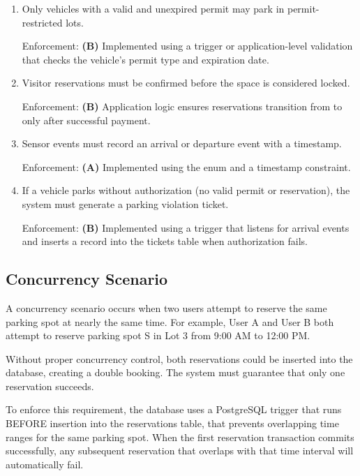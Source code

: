 \documentclass[12pt]{report}
\begin{document}
\begin{enumerate}[label=\textbf{Rule \arabic*:}]
\item Only vehicles with a valid and unexpired permit may park in permit-restricted lots.

Enforcement: \textbf{(B)} Implemented using a trigger or application-level validation that checks the vehicle's permit type and expiration date.

\item Visitor reservations must be confirmed before the space is considered locked.

Enforcement: \textbf{(B)} Application logic ensures reservations transition from  to  only after successful payment.

\item Sensor events must record an arrival or departure event with a timestamp.

Enforcement: \textbf{(A)} Implemented using the  enum and a  timestamp constraint.

\item If a vehicle parks without authorization (no valid permit or reservation), the system must generate a parking violation ticket.

Enforcement: \textbf{(B)} Implemented using a trigger that listens for arrival events and inserts a record into the tickets table when authorization fails.

\end{enumerate}

\subsection{Concurrency Scenario}

A concurrency scenario occurs when two users attempt to reserve the same parking spot at nearly the same time. For example, User A and User B both attempt to reserve parking spot S in Lot 3 from 9:00 AM to 12:00 PM.

Without proper concurrency control, both reservations could be inserted into the database, creating a double booking. The system must guarantee that only one reservation succeeds.

To enforce this requirement, the database uses a PostgreSQL trigger that runs BEFORE insertion into the reservations table, that prevents overlapping time ranges for the same parking spot. When the first reservation transaction commits successfully, any subsequent reservation that overlaps with that time interval will automatically fail.
\end{document}
